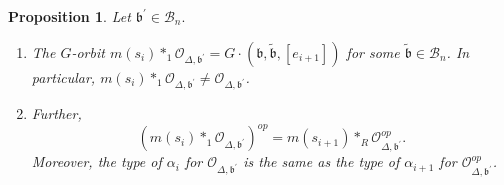 \documentclass[12pt]{amsart}
\numberwithin{equation}{section}
\newtheorem{prop}[thm]{Proposition}
\newcommand{\fb}{\mbox{${\mathfrak b}$}}
\newcommand{\B}{\mathcal{B}}
\begin{document}
\begin{prop}\label{p:orbitchange}
 Let $\fb^{\prime} \in \B_n.$
\begin{enumerate}
\item The $G$-orbit $m(s_{i})*_{1}\mathcal{O}_{\Delta,\fb^{\prime}}=G\cdot (\fb, \tilde{\fb}, [e_{i+1}])$ for some $\tilde{\fb}\in\B_{n}$.  In particular, $m(s_{i})*_{1}\mathcal{O}_{\Delta,\fb^{\prime}}\neq \mathcal{O}_{\Delta,\fb^{\prime}}$.  
\item Further,
 \begin{equation}\label{eq:cplxstableinter}
(m(s_{i})*_{1}\mathcal{O}_{\Delta,\fb^{\prime}})^{op}=m(s_{i+1})*_{R}\mathcal{O}_{\Delta, \fb^{\prime}}^{op}.
\end{equation}
Moreover, the type of $\alpha_{i}$ for $\mathcal{O}_{\Delta,\fb^{\prime}}$ is the same as the type of $\alpha_{i+1}$ for $\mathcal{O}_{\Delta,\fb^{\prime}}^{op}$. 

\end{enumerate}
\end{prop}
\end{document}
